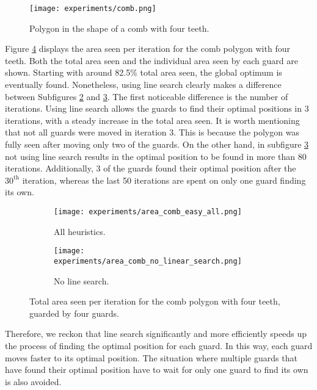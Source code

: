 \begin{figure}[h!]
    \centering
    \texttt{[image: experiments/comb.png]}
    \caption{Polygon in the shape of a comb with four teeth.}
    \label{fig:comb}
\end{figure}

Figure \ref{fig:no_line_search} displays the area seen per iteration for the comb polygon with four teeth. Both the total area seen and the individual area seen by each guard are shown. Starting with around 82.5\% total area seen, the global optimum is eventually found. Nonetheless, using line search clearly makes a difference between Subfigures \ref{fig:no_line_search1} and \ref{fig:no_line_search2}. The first noticeable difference is the number of iterations. Using line search allows the guards to find their optimal positions in 3 iterations, with a steady increase in the total area seen. It is worth mentioning that not all guards were moved in iteration 3. This is because the polygon was fully seen after moving only two of the guards. On the other hand, in subfigure \ref{fig:no_line_search2} not using line search results in the optimal position to be found in more than 80 iterations. Additionally, 3 of the guards found their optimal position after the $30^{\text{th}}$ iteration, whereas the last 50 iterations are spent on only one guard finding its own.


\begin{figure}[h!]
    \centering
    \begin{subfigure}{0.45\textwidth}
        \texttt{[image: experiments/area\_comb\_easy\_all.png]}
        \caption{All heuristics.}
        \label{fig:no_line_search1}
    \end{subfigure}
    \begin{subfigure}{0.45\textwidth}
        \texttt{[image: experiments/area\_comb\_no\_linear\_search.png]}
        \caption{No line search.}
        \label{fig:no_line_search2}
    \end{subfigure}
    \caption{Total area seen per iteration for the comb polygon with four teeth, guarded by four guards.}
    \label{fig:no_line_search}
\end{figure}

Therefore, we reckon that line search significantly and more efficiently speeds up the process of finding the optimal position for each guard. In this way, each guard moves faster to its optimal position. The situation where multiple guards that have found their optimal position have to wait for only one guard to find its own is also avoided.

